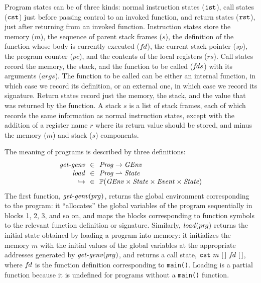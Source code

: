 Program states can be of three kinds: normal instruction states ($\mathtt{ist}$), call states ($\mathtt{cst}$)
just before passing control to an invoked function, and return states ($\mathtt{rst}$), just after
returning from an invoked function.  Instruction states store the memory ($m$), the sequence of
parent stack frames ($s$), the definition of the function whose body is currently executed (${f\hspace*{-1pt}d}$),
the current stack pointer ($sp$), the program counter ($pc$), and the contents of the local
registers ($rs$).  Call states record the memory, the stack, and the function to be called (${f\hspace*{-1pt}ds}$)
with its arguments ($args$).  The function to be called can be either an internal function, in which
case we record its definition, or an external one, in which case we record its signature.  Return
states record just the memory, the stack, and the value that was returned by the function.  A stack
$s$ is a list of stack frames, each of which records the same information as normal instruction
states, except with the addition of a register name $r$ where its return value should be stored, and
minus the memory ($m$) and stack ($s$) components.

The meaning of programs is described by three definitions:
\[
\begin{array}{r@{~~}c@{~~}l}
\rtlgenv &\in& \rtlProg \to \rtlGEnv \\
\rtlload &\in& \rtlProg \pfun \rtlState\\
\estep{} &\in& \powset{\rtlGEnv\times\rtlState\times\rtlEvent\times\rtlState}\\
\end{array}
\]
The first function, $\mathit{get\text{-}genv}({pr\hspace*{-1pt}g})$, returns the global environment corresponding to the program:
it ``allocates'' the global variables of the program sequentially in blocks 1, 2, 3, and so on, and
maps the blocks corresponding to function symbols to the relevant function definition or signature.
Similarly, $\mathit{load}({pr\hspace*{-1pt}g})$ returns the initial state obtained by loading a program into memory: it
initializes the memory $m$ with the initial values of the global variables at the appropriate
addresses generated by $\mathit{get\text{-}genv}({pr\hspace*{-1pt}g})$, and returns a call state, $\mathtt{cst}~m~[\,]~{f\hspace*{-1pt}d}~[\,]$,
where ${f\hspace*{-1pt}d}$ is the function definition corresponding to \texttt{main()}.  Loading is a partial
function because it is undefined for programs without a \texttt{main()} function.



